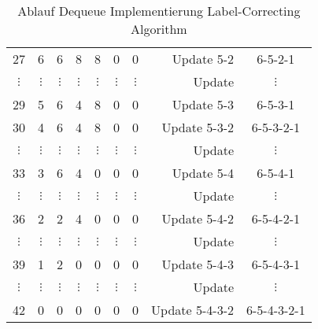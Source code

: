 \documentclass{scrartcl}
\begin{document}
\begin{table}[h]
\begin{tabular}{c|cccccc|rc}
          27       & 6 & 6 & 8 & 8 & 0 & 0 & Update 5-2 & 6-5-2-1\\
          $\vdots$       & $\vdots$ & $\vdots$ & $\vdots$ & $\vdots$ & $\vdots$ & $\vdots$ & Update & $\vdots$\\
          29       & 5 & 6 & 4 & 8 & 0 & 0 & Update 5-3 & 6-5-3-1\\
          30       & 4 & 6 & 4 & 8 & 0 & 0 & Update 5-3-2 & 6-5-3-2-1\\
          $\vdots$       & $\vdots$ & $\vdots$ & $\vdots$ & $\vdots$ & $\vdots$ & $\vdots$ & Update & $\vdots$\\
          33       & 3 & 6 & 4 & 0 & 0 & 0 & Update 5-4 & 6-5-4-1\\
          $\vdots$       & $\vdots$ & $\vdots$ & $\vdots$ & $\vdots$ & $\vdots$ & $\vdots$ & Update & $\vdots$\\
          36       & 2 & 2 & 4 & 0 & 0 & 0 & Update 5-4-2 & 6-5-4-2-1\\
          $\vdots$       & $\vdots$ & $\vdots$ & $\vdots$ & $\vdots$ & $\vdots$ & $\vdots$ & Update & $\vdots$\\
          39       & 1 & 2 & 0 & 0 & 0 & 0 & Update 5-4-3 & 6-5-4-3-1\\
          $\vdots$       & $\vdots$ & $\vdots$ & $\vdots$ & $\vdots$ & $\vdots$ & $\vdots$ & Update & $\vdots$\\
          42       & 0 & 0 & 0 & 0 & 0 & 0 & Update 5-4-3-2 & 6-5-4-3-2-1\\
       \end{tabular}
  \caption{Ablauf Dequeue Implementierung Label-Correcting Algorithm}
  \label{tab:alg}
\end{table}
\end{document}

